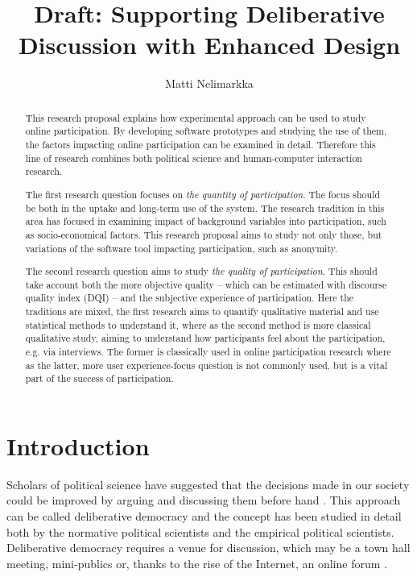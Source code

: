 \documentclass{article}
\author{Matti Nelimarkka}
\title{Draft: Supporting Deliberative Discussion with Enhanced Design}
\begin{document}
\maketitle

\setlength{\parindent}{0pt}
\setlength{\parskip}{1ex}

\begin{abstract}
This research proposal explains how experimental approach can be used to study online participation. By developing software prototypes and studying the use of them, the factors impacting online participation can be examined in detail. Therefore this line of research combines both political science and human-computer interaction research.

The first research question focuses on \textit{the quantity of participation}. The focus should be both in the uptake and long-term use of the system. The research tradition in this area has focused in examining impact of background variables into participation, such as socio-economical factors. This research proposal aims to study not only those, but variations of the software tool impacting participation, such as anonymity.

The second research question aims to study \textit{the quality of participation}. This should take account both the more objective quality -- which can be estimated with  discourse quality index (DQI) -- and the subjective experience of participation. Here the traditions are mixed, the first research aims to quantify qualitative material and use statistical methods to understand it, where as the second method is more classical qualitative study, aiming to understand how participants feel about the participation, e.g. via interviews. The former is classically used in online participation research where as the latter, more user experience-focus question is not commonly used, but is a vital part of the success of participation.
\end{abstract}

\newpage

\section{Introduction}
Scholars of political science have suggested that the decisions made in our society could be improved by arguing and discussing them before hand . This approach can be called deliberative democracy and the concept has been studied in detail both by the normative political scientists and the empirical political scientists. Deliberative democracy requires a venue for discussion, which may be a town hall meeting, mini-publics or, thanks to the rise of the Internet, an online forum .
\end{document}

